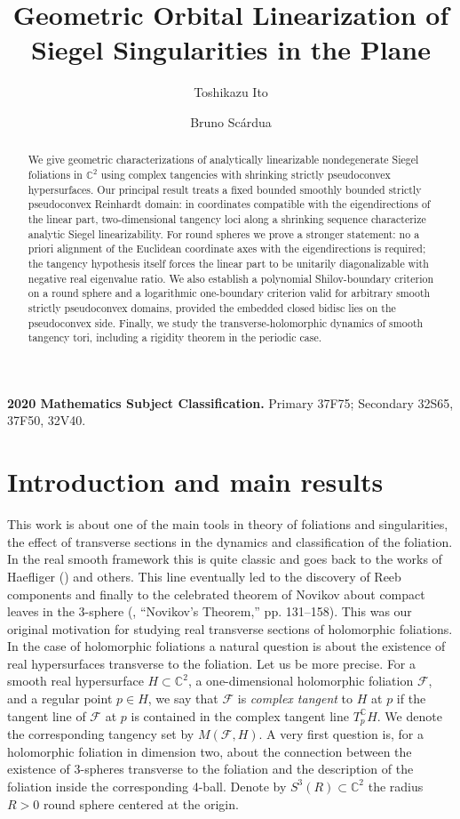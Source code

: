 \documentclass[11pt,reqno]{article}
\title{Geometric Orbital Linearization of Siegel Singularities in the Plane}
\author{Toshikazu Ito \and Bruno Sc\'ardua}
\date{}
\theoremstyle{remark}
\newcommand{\C}{\mathbb C}
\newcommand{\F}{\mathcal F}
\begin{document}
\maketitle

\begin{abstract}
We give geometric characterizations of analytically linearizable nondegenerate Siegel foliations in $\C^2$ using complex tangencies with shrinking strictly pseudoconvex hypersurfaces. Our principal result treats a fixed bounded smoothly bounded strictly pseudoconvex Reinhardt domain: in coordinates compatible with the eigendirections of the linear part, two-dimensional tangency loci along a shrinking sequence characterize analytic Siegel linearizability. For round spheres we prove a stronger statement: no a priori alignment of the Euclidean coordinate axes with the eigendirections is required; the tangency hypothesis itself forces the linear part to be unitarily diagonalizable with negative real eigenvalue ratio. We also establish a polynomial Shilov-boundary criterion on a round sphere and a logarithmic one-boundary criterion valid for arbitrary smooth strictly pseudoconvex domains, provided the embedded closed bidisc lies on the pseudoconvex side. Finally, we study the transverse-holomorphic dynamics of smooth tangency tori, including a rigidity theorem in the periodic case.
\end{abstract}
\medskip
\noindent\textbf{2020 Mathematics Subject Classification.} Primary 37F75; Secondary 32S65, 37F50, 32V40.
\tableofcontents
\section{Introduction and main results}

This work is about one of the main tools in theory of foliations and singularities, 
the effect of transverse sections in the dynamics and classification of the foliation.
In the real smooth framework this is quite classic and goes back to the works of Haefliger
(\cite{Haefliger}) and others. This line eventually led to the discovery of Reeb components and
finally to the celebrated theorem of Novikov about compact leaves in the 3-sphere (\cite{Camacho-LN}, “Novikov’s Theorem,” pp. 131–158). This was our original motivation for studying real transverse sections of holomorphic foliations. In the case of holomorphic foliations a natural question is about the existence of real hypersurfaces transverse to the foliation.  Let us be more precise.
For a smooth real hypersurface $H\subset\C^2$, a one-dimensional holomorphic foliation $\F$, and a regular point $p\in H$, we say that $\F$ is \emph{complex tangent} to $H$ at $p$ if the tangent line of $\F$ at $p$ is contained in the complex tangent line $T_p^{\C}H$. We denote the corresponding tangency set by $M(\F,H)$. A very first question is, for a holomorphic foliation in dimension two,  about the 
connection between the existence of   3-spheres transverse to the foliation and the description of the foliation inside the corresponding 4-ball. Denote by $S^3(R)\subset \mathbb C^2$ the radius $R>0$ round sphere centered at the origin. 
\end{document}
